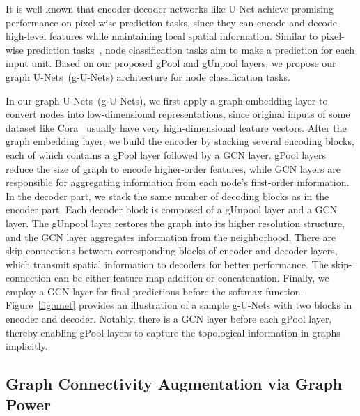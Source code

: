 \documentclass{article}
\begin{document}
It is well-known that encoder-decoder networks like U-Net achieve
promising performance on pixel-wise prediction tasks, since they can
encode and decode high-level features while maintaining local
spatial information. Similar to pixel-wise prediction
tasks~\citep{gong2013deep,ronneberger2015u}, node classification
tasks aim to make a prediction for each input unit. Based on our
proposed gPool and gUnpool layers, we propose our graph
U-Nets~(g-U-Nets) architecture for node classification tasks.

In our graph U-Nets~(g-U-Nets), we first apply a graph embedding
layer to convert nodes into low-dimensional representations, since
original inputs of some dataset like Cora~\citep{sen2008collective}
usually have very high-dimensional feature vectors. After the graph
embedding layer, we build the encoder by stacking several encoding
blocks, each of which contains a gPool layer followed by a GCN
layer. gPool layers reduce the size of graph to encode higher-order
features, while GCN layers are responsible for aggregating
information from each node's first-order information. In the decoder
part, we stack the same number of decoding blocks as in the encoder
part. Each decoder block is composed of a gUnpool layer and a GCN
layer. The gUnpool layer restores the graph into its higher
resolution structure, and the GCN layer aggregates information from
the neighborhood. There are skip-connections between corresponding
blocks of encoder and decoder layers, which transmit spatial
information to decoders for better performance. The skip-connection
can be either feature map addition or concatenation. Finally, we
employ a GCN layer for final predictions before the softmax
function. Figure~\ref{fig:unet} provides an illustration of a sample
g-U-Nets with two blocks in encoder and decoder.
Notably, there is a GCN layer before each gPool layer, thereby
enabling gPool layers to capture the topological information in
graphs implicitly.


\subsection{Graph Connectivity Augmentation via Graph Power}\label{sec:aug}
\end{document}
